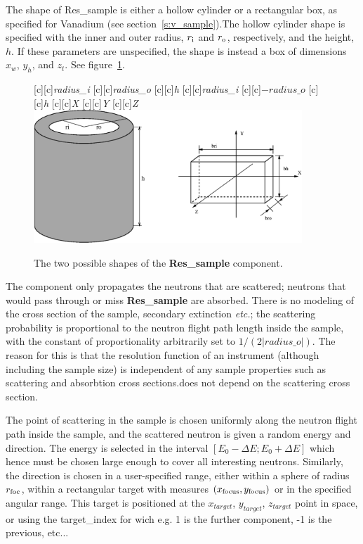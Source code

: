 The shape of {\rm Res\_sample} is either a hollow cylinder
or a rectangular box, as specified for {\rm Vanadium}
(see section~\ref{s:v_sample}).The hollow cylinder shape is
specified with the inner and outer radius, $r_{\rm i}$ and $r_{\rm o}$,
respectively, and the height, $h$.
If these parameters are unspecified,
the shape is instead a box of dimensions $x_w$, $y_h$, and $z_t$.
See figure~\ref{f:res_sample}.\par
%
\begin{figure}[htbp]
  \begin{center}
        [c][c]{\textit{radius\_i}}
        [c][c]{\textit{radius\_o}}
        [c][c]{\textit{h}}
        [c][c]{\textit{radius\_i}}
        [c][c]{$-\textit{radius\_o}$}
        [c][c]{\textit{h}}
        [c][c]{\textit{X}}
        [c][c]{\textit{Y}}
        [c][c]{\textit{Z}}
        \includegraphics[width=0.9\textwidth]{figures/res_sample.eps}
    \caption{The two possible shapes of the \textbf{Res\_sample} component.}
    \label{f:res_sample}
  \end{center}
\end{figure}
%
The component only propagates the neutrons that are scattered; neutrons
that would pass through or miss {\bf Res\_sample} are absorbed. There is no
modeling of the cross section of the sample, secondary extinction
\textit{etc.}; the scattering probability is proportional to the neutron
flight path length inside the sample, with the constant of
proportionality arbitrarily set to $1/(2|\textit{radius\_o}|)$. The
reason for this is that the resolution
function of an instrument (although including the sample size)
is independent of any sample properties such as scattering
and absorbtion cross sections.does not depend on the scattering
cross section.

The point of scattering in the sample is chosen uniformly
along the neutron flight path inside the sample, and the scattered
neutron is given a random energy and direction. The energy is selected in
the interval $[E_0-\Delta E; E_0+\Delta E]$ which hence must be
chosen large enough to cover all interesting neutrons. Similarly, the
direction is chosen in a user-specified range,
either within a sphere of radius $r_{\rm foc}$, within a rectangular
target with measures $(x_{\rm focus}, y_{\rm focus})$
or in the specified angular range. This target is positioned at the $x_{target}$, $y_{target}$, $z_{target}$ point in space, or using the target\_index for wich e.g. 1 is the further component, -1 is the previous, etc...


